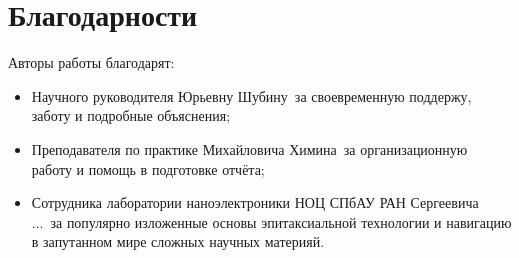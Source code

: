 \documentclass[a4paper,12pt]{article}
\begin{document}
\section{Благодарности}
Авторы работы благодарят:\\
\begin{itemize}
\item{} Научного руководителя  Юрьевну Шубину\normalfont\
за своевременную поддержу, заботу и подробные объяснения;
\item{} Преподавателя по практике  Михайловича Химина\normalfont\ 
за организационную работу и помощь в подготовке отчёта;
\item{} Сотрудника лаборатории наноэлектроники НОЦ СПбАУ РАН \bfseriesМаксима Сергеевича ...\normalfont\ за популярно изложенные основы эпитаксиальной технологии и навигацию в запутанном мире сложных научных материяй.
\end{itemize}
\end{document}
